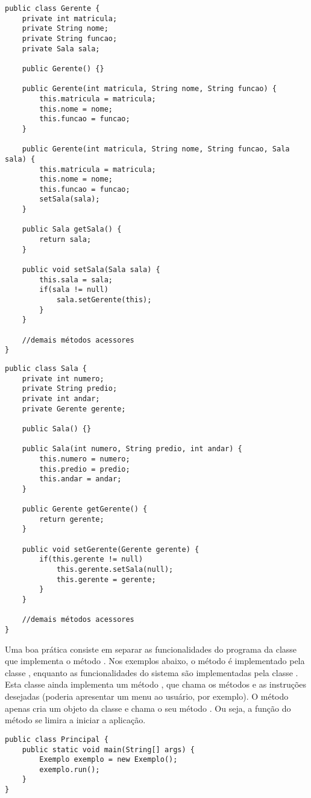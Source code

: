 \begin{verbatim}
public class Gerente {
	private int matricula;
	private String nome;
	private String funcao;
	private Sala sala;
	
	public Gerente() {}
	
	public Gerente(int matricula, String nome, String funcao) {
		this.matricula = matricula;
		this.nome = nome;
		this.funcao = funcao;
	}
	
	public Gerente(int matricula, String nome, String funcao, Sala sala) {
		this.matricula = matricula;
		this.nome = nome;
		this.funcao = funcao;
		setSala(sala);
	}
	
	public Sala getSala() {
		return sala;
	}
	
	public void setSala(Sala sala) {
		this.sala = sala;
		if(sala != null)
			sala.setGerente(this);
		}
	}
	
	//demais métodos acessores
}
\end{verbatim}
 
\begin{verbatim}
public class Sala {
	private int numero;
	private String predio;
	private int andar;
	private Gerente gerente;
	
	public Sala() {}
	
	public Sala(int numero, String predio, int andar) {
		this.numero = numero;
		this.predio = predio;
		this.andar = andar;
	}
	
	public Gerente getGerente() {
		return gerente;
	}
	
	public void setGerente(Gerente gerente) {
		if(this.gerente != null)
			this.gerente.setSala(null);
			this.gerente = gerente;
		}
	}
	
	//demais métodos acessores
}
\end{verbatim}
 
Uma boa prática consiste em separar as funcionalidades do programa da classe que implementa o método . Nos exemplos abaixo, o método  é implementado pela classe , enquanto as funcionalidades do sistema são implementadas pela classe . Esta classe ainda implementa um método , que chama os métodos e as instruções desejadas (poderia apresentar um menu ao usuário, por exemplo). O método  apenas cria um objeto da classe  e chama o seu método . Ou seja, a função do método  se limira a iniciar a aplicação.
 
\begin{verbatim}
public class Principal {
	public static void main(String[] args) {
		Exemplo exemplo = new Exemplo();
		exemplo.run();
	}
}
\end{verbatim}
 
